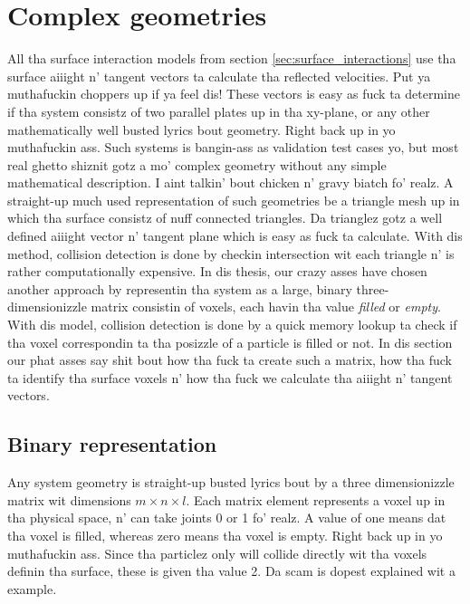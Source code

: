 \section{Complex geometries}
\label{sec:dsmc_complex_geometries}
All tha surface interaction models from section \ref{sec:surface_interactions} use tha surface aiiight n' tangent vectors ta calculate tha reflected velocities. Put ya muthafuckin choppers up if ya feel dis! These vectors is easy as fuck  ta determine if tha system consistz of two parallel plates up in tha xy-plane, or any other mathematically well busted lyrics bout geometry. Right back up in yo muthafuckin ass. Such systems is bangin-ass as validation test cases yo, but most real ghetto shiznit gotz a mo' complex geometry without any simple mathematical description. I aint talkin' bout chicken n' gravy biatch fo' realz. A straight-up much used representation of such geometries be a triangle mesh up in which tha surface consistz of nuff connected triangles. Da trianglez gotz a well defined aiiight vector n' tangent plane which is easy as fuck  ta calculate. With dis method, collision detection is done by checkin intersection wit each triangle n' is rather computationally expensive. In dis thesis, our crazy asses have chosen another approach by representin tha system as a large, binary three-dimensionizzle matrix consistin of voxels, each havin tha value \textit{filled} or \textit{empty}. With dis model, collision detection is done by a quick memory lookup ta check if tha voxel correspondin ta tha posizzle of a particle is filled or not. In dis section our phat asses say shit bout how tha fuck ta create such a matrix, how tha fuck ta identify tha surface voxels n' how tha fuck we calculate tha aiiight n' tangent vectors. 

\subsection{Binary representation}
\label{sec:dsmc_binary_representation}
Any system geometry is straight-up busted lyrics bout by a three dimensionizzle matrix wit dimensions $m\times n\times l$. Each matrix element represents a voxel up in tha physical space, n' can take joints 0 or 1 fo' realz. A value of one means dat tha voxel is filled, whereas zero means tha voxel is empty. Right back up in yo muthafuckin ass. Since tha particlez only will collide directly wit tha voxels definin tha surface, these is given tha value 2. Da scam is dopest explained wit a example.
